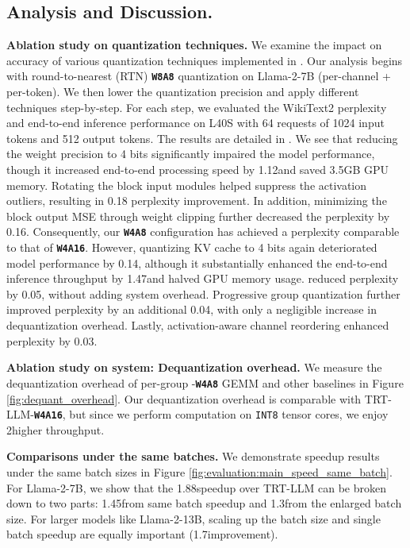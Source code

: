 \subsection{Analysis and Discussion.}

\textbf{Ablation study on quantization techniques.} We examine the impact on accuracy of various quantization techniques implemented in \algo. 
Our analysis begins with round-to-nearest (RTN) \textbf{\texttt{W8A8}} quantization on Llama-2-7B (per-channel + per-token). We then lower the quantization precision and apply different techniques step-by-step. For each step, we evaluated the WikiText2 perplexity and end-to-end inference performance on L40S with 64 requests of 1024 input tokens and 512 output tokens.
The results are detailed in .
We see that reducing the weight precision to 4 bits significantly impaired the model performance, though it increased end-to-end processing speed by 1.12\x and saved 3.5GB GPU memory. Rotating the block input modules helped suppress the activation outliers, resulting in 0.18 perplexity improvement. In addition, minimizing the block output MSE through weight clipping further decreased the perplexity by 0.16. Consequently, our \textbf{\texttt{W4A8}} configuration has achieved a perplexity comparable to that of \textbf{\texttt{W4A16}}. However, quantizing KV cache to 4 bits again deteriorated model performance by 0.14, although it substantially enhanced the end-to-end inference throughput by 1.47\x and halved GPU memory usage. \smoothattention reduced perplexity by 0.05, without adding system overhead. Progressive group quantization further improved perplexity by an additional 0.04, with only a negligible increase in dequantization overhead. Lastly, activation-aware channel reordering enhanced perplexity by 0.03.


\textbf{Ablation study on \system system: Dequantization overhead.} We measure the dequantization overhead of per-group \system-\textbf{\texttt{W4A8}} GEMM and other baselines in Figure \ref{fig:dequant_overhead}. Our dequantization overhead is comparable with TRT-LLM-\textbf{\texttt{W4A16}}, but since we perform computation on \texttt{INT8} tensor cores, we enjoy 2\x higher throughput. 

\textbf{Comparisons under the same batches.} We demonstrate speedup results under the same batch sizes in Figure \ref{fig:evaluation:main_speed_same_batch}. For Llama-2-7B, we show that the 1.88\x speedup over TRT-LLM can be broken down to two parts: 1.45\x from same batch speedup and 1.3\x from the enlarged batch size. For larger models like Llama-2-13B, scaling up the batch size and single batch speedup are equally important (1.7\x improvement). 




